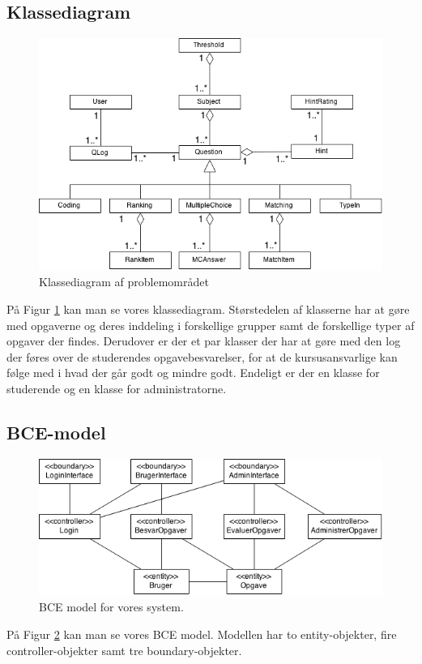 \documentclass[11pt, a4paper]{article}
\begin{document}
\subsection{Klassediagram}
\begin{figure}[h]
    \centering
    \includegraphics[width=0.8\linewidth]{figures/ClassDiagram.png}
    \caption{Klassediagram af problemområdet}
    \label{fig:class_diagram}
\end{figure}
På Figur \ref{fig:class_diagram} kan man se vores klassediagram. Størstedelen af klasserne har at gøre med opgaverne og deres inddeling i forskellige grupper samt de forskellige typer af opgaver der findes. Derudover er der et par klasser der har at gøre med den log der føres over de studerendes opgavebesvarelser, for at de kursusansvarlige kan følge med i hvad der går godt og mindre godt. Endeligt er der en klasse for studerende og en klasse for administratorne.
\subsection{BCE-model}
\begin{figure}[h]
  \centering
  \includegraphics[width=0.8\linewidth]{figures/BCE-Model.png}
  \caption{BCE model for vores system.}
  \label{fig:bce_model}
\end{figure}
På Figur \ref{fig:bce_model} kan man se vores BCE model. Modellen har to entity-objekter, fire controller-objekter samt tre boundary-objekter.
\end{document}
